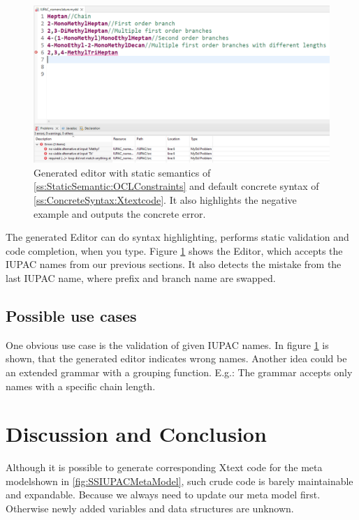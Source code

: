 \documentclass[
fontsize=11pt,
paper=a4,
abstract=true,
numbers=noenddot,
listof=totoc,
bibliography=totoc,
twoside,
open=right,
cleardoublepage=plain,
parskip=half+, %
BCOR=1cm, %
]{scrreprt}
\newcommand{\screenshotWidth}{1.0}
\newcommand{\metamodel}{meta model}
\begin{document}
\begin{figure}[H]
    \centering
    \includegraphics[width=\screenshotWidth\textwidth]{./Screenshots/GraphicalEditor.PNG}
    \caption{Generated editor with static semantics of \ref{ss:StaticSemantic:OCLConstraints} and default concrete syntax of \ref{ss:ConcreteSyntax:Xtextcode}. It also highlights the negative example and outputs the concrete error.}
    \label{fig:GraphicalEditor}
\end{figure}

The generated Editor can do syntax highlighting, performs static validation and code completion, when you type. Figure \ref{fig:GraphicalEditor} shows the Editor, which accepts the IUPAC names from our previous sections. It also detects the mistake from the last IUPAC name, where prefix and branch name are swapped.

\section{Possible use cases}\label{ss:PossibleUseCases}
One obvious use case is the validation of given IUPAC names. In figure \ref{fig:GraphicalEditor} is shown, that the generated editor indicates wrong names. Another idea could be an extended grammar with a grouping function. E.g.: The grammar accepts only names with a specific chain length. 



\chapter{Discussion and Conclusion}\label{s:DiscussionandConclusion}
Although it is possible to generate corresponding Xtext code for the \metamodel\space shown in \ref{fig:SSIUPACMetaModel}, such crude code is barely maintainable and expandable. Because we always need to update our meta model first. Otherwise newly added variables and data structures are unknown.\\
\end{document}
